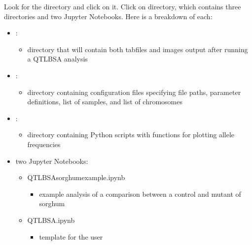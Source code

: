\documentclass[letterpaper,10pt,english]{sphinxhowto}
\begin{document}
\sphinxAtStartPar
Look for the directory  and click on it. Click on  directory, which contains three directories and two Jupyter Notebooks. Here is a breakdown of each:
\begin{itemize}
\item {} 
\sphinxAtStartPar
{}:
\begin{itemize}
\item {} 
\sphinxAtStartPar
directory that will contain both tab\sphinxhyphen{}files and images output after running a QTL\sphinxhyphen{}BSA analysis

\end{itemize}

\item {} 
\sphinxAtStartPar
{}:
\begin{itemize}
\item {} 
\sphinxAtStartPar
directory containing configuration files specifying file paths, parameter definitions, list of samples, and list of chromosomes

\end{itemize}

\item {} 
\sphinxAtStartPar
{}:
\begin{itemize}
\item {} 
\sphinxAtStartPar
directory containing Python scripts with functions for plotting allele frequencies

\end{itemize}

\item {} 
\sphinxAtStartPar
two Jupyter Notebooks:
\begin{itemize}
\item {} 
\sphinxAtStartPar
QTL\sphinxhyphen{}BSA\sphinxhyphen{}sorghum\sphinxhyphen{}example.ipynb
\begin{itemize}
\item {} 
\sphinxAtStartPar
example analysis of a comparison between a control and mutant of sorghum

\end{itemize}

\item {} 
\sphinxAtStartPar
QTL\sphinxhyphen{}BSA.ipynb
\begin{itemize}
\item {} 
\sphinxAtStartPar
template for the user

\end{itemize}

\end{itemize}

\end{itemize}
\end{document}
